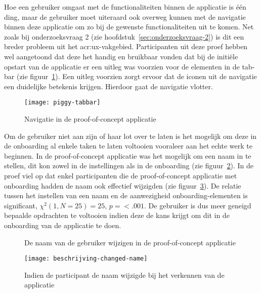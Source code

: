 Hoe een gebruiker omgaat met de functionaliteiten binnen de applicatie is één ding, maar de gebruiker moet uiteraard ook overweg kunnen met de navigatie binnen deze applicatie om zo bij de gewenste functionaliteiten uit te komen. Net zoals bij onderzoeksvraag 2 (zie hoofdstuk~\ref{sec:onderzoeksvraag-2}) is dit een breder probleem uit het \acrshort{acr:ux}-vakgebied. Participanten uit deze proef hebben wel aangetoond dat deze het handig en bruikbaar vonden dat bij de initiële opstart van de applicatie er een uitleg was voorzien voor de elementen in de tab-bar (zie figuur~\ref{fig:piggy:tabbar}). Een uitleg voorzien zorgt ervoor dat de iconen uit de navigatie een duidelijke betekenis krijgen. Hierdoor gaat de navigatie vlotter.

\begin{figure}[h!]
    \centering
    \texttt{[image: piggy-tabbar]}
    \caption{Navigatie in de proof-of-concept applicatie}
    \label{fig:piggy:tabbar}
\end{figure}

Om de gebruiker niet aan zijn of haar lot over te laten is het mogelijk om deze in de onboarding al enkele taken te laten voltooien vooraleer aan het echte werk te beginnen. In de proof-of-concept applicatie was het mogelijk om een naam in te stellen, dit kon zowel in de instellingen als in de onboarding (zie figuur~\ref{fig:piggy:name}). In de proef viel op dat enkel participanten die de proof-of-concept applicatie met onboarding hadden de naam ook effectief wijzigden (zie figuur~\ref{fig:beschrijving-changed-name}). De relatie tussen het instellen van een naam en de aanwezigheid onboarding-elementen is significant, $\chi^2 (1, N = 25) = 25$, $p = < .001$. De gebruiker is dus meer geneigd bepaalde opdrachten te voltooien indien deze de kans krijgt om dit in de onboarding van de applicatie te doen.

\begin{figure}[h!]
	\centering
	\qquad
	\qquad
	\caption{De naam van de gebruiker wijzigen in de proof-of-concept applicatie}
	\label{fig:piggy:name}
\end{figure}

\begin{figure}[h]
	\centering
	\texttt{[image: beschrijving-changed-name]}
	\caption{Indien de participant de naam wijzigde bij het verkennen van de applicatie}
	\label{fig:beschrijving-changed-name}
\end{figure}
